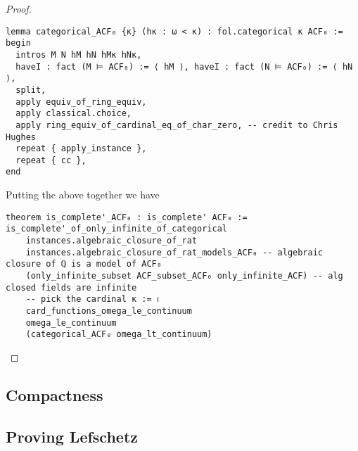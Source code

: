 \begin{proof}
\begin{lstlisting}
lemma categorical_ACF₀ {κ} (hκ : ω < κ) : fol.categorical κ ACF₀ :=
begin
  intros M N hM hN hMκ hNκ,
  haveI : fact (M ⊨ ACF₀) := ⟨ hM ⟩, haveI : fact (N ⊨ ACF₀) := ⟨ hN ⟩,
  split,
  apply equiv_of_ring_equiv,
  apply classical.choice,
  apply ring_equiv_of_cardinal_eq_of_char_zero, -- credit to Chris Hughes
  repeat { apply_instance },
  repeat { cc },
end\end{lstlisting}

Putting the above together we have
\begin{lstlisting}
theorem is_complete'_ACF₀ : is_complete' ACF₀ :=
is_complete'_of_only_infinite_of_categorical
    instances.algebraic_closure_of_rat
    instances.algebraic_closure_of_rat_models_ACF₀ -- algebraic closure of ℚ is a model of ACF₀
    (only_infinite_subset ACF_subset_ACF₀ only_infinite_ACF) -- alg closed fields are infinite
    -- pick the cardinal κ := 𝔠
    card_functions_omega_le_continuum
    omega_le_continuum
    (categorical_ACF₀ omega_lt_continuum) \end{lstlisting}
\end{proof}

\subsection{Compactness}



\subsection{Proving Lefschetz}
